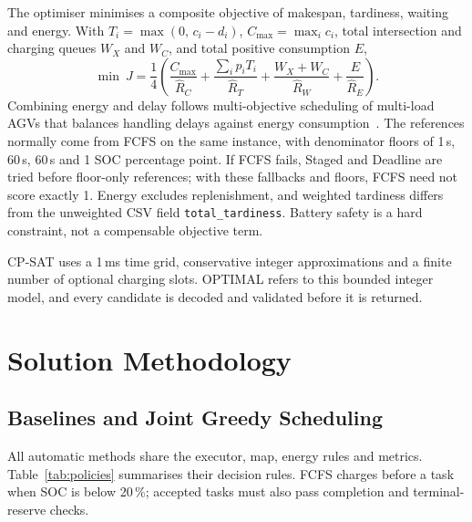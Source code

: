\documentclass[11pt,a4paper]{article}
\newcommand{\code}[1]{\texttt{#1}}
\newcommand{\pct}{\,\%}
\begin{document}
The optimiser minimises a composite objective of makespan, tardiness, waiting and energy. With
$T_i = \max(0,\, c_i - d_i)$, $C_{\max} = \max_i c_i$, total intersection and charging queues $W_X$
and $W_C$, and total positive consumption $E$,
\begin{equation}
\min\ J = \frac{1}{4}\left( \frac{C_{\max}}{\hat R_C} + \frac{\sum_i p_i T_i}{\hat R_T}
  + \frac{W_X + W_C}{\hat R_W} + \frac{E}{\hat R_E} \right).
\label{eq:J}
\end{equation}
Combining energy and delay follows multi-objective scheduling of multi-load AGVs that
balances handling delays against energy consumption~\cite{huo2024multiload}. The references normally
come from FCFS on the same instance, with denominator floors of 1\,s, 60\,s, 60\,s and 1 SOC percentage
point. If FCFS fails, Staged and Deadline are tried before floor-only references; with these fallbacks and floors,
FCFS need not score exactly 1. Energy excludes replenishment, and weighted tardiness differs from the
unweighted CSV field \code{total\_tardiness}. Battery safety is a hard constraint, not a compensable
objective term.

CP-SAT uses a 1\,ms time grid, conservative integer approximations and a finite number of optional
charging slots. OPTIMAL refers to this bounded integer model, and every candidate is decoded and
validated before it is returned.

\section{Solution Methodology}
\label{sec:methods}

\subsection{Baselines and Joint Greedy Scheduling}

All automatic methods share the executor, map, energy rules and metrics. Table~\ref{tab:policies}
summarises their decision rules. FCFS charges before a task when SOC is below 20\pct; accepted tasks
must also pass completion and terminal-reserve checks.
\end{document}
